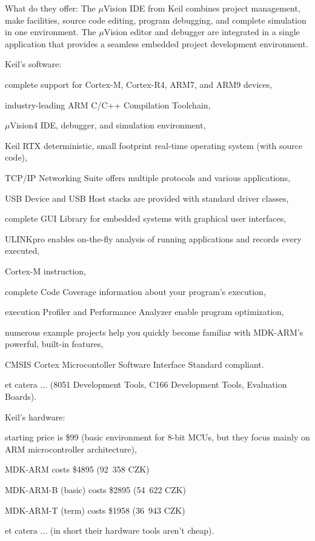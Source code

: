 \documentclass[a4paper,twoside,15pt]{book}
\begin{document}
			What do they offer:
			The $\mu$Vision IDE from Keil combines project management, make facilities, source code editing, program debugging, and complete simulation in one environment. The $\mu$Vision editor and debugger are integrated in a single application that provides a seamless embedded project development environment.
			\begin{dinglist}{73}
				\item Keil's software:
					\begin{dinglist}{75}
						\item complete support for Cortex-M, Cortex-R4, ARM7, and ARM9 devices,
						\item industry-leading ARM C/C++ Compilation Toolchain,
						\item $\mu$Vision4 IDE, debugger, and simulation environment,
						\item Keil RTX deterministic, small footprint real-time operating system (with source code),
						\item TCP/IP Networking Suite offers multiple protocols and various applications,
						\item USB Device and USB Host stacks are provided with standard driver classes,
						\item complete GUI Library for embedded systems with graphical user interfaces,
						\item ULINKpro enables on-the-fly analysis of running applications and records every executed,
						\item Cortex-M instruction,
						\item complete Code Coverage information about your program's execution,
						\item execution Profiler and Performance Analyzer enable program optimization,
						\item numerous example projects help you quickly become familiar with MDK-ARM's powerful, built-in features,
						\item CMSIS Cortex Microcontoller Software Interface Standard compliant.
						\item et catera ... (8051 Development Tools, C166 Development Tools, Evaluation Boards).
					\end{dinglist}
				\item Keil's hardware:
					\begin{dinglist}{75}
						\item starting price is \$99 (basic environment for 8-bit MCUs, but they focus mainly on ARM microcontroller architecture),
						\item MDK-ARM costs \$4895 (92~358 CZK)
						\item MDK-ARM-B (basic) costs \$2895 (54~622 CZK)
						\item MDK-ARM-T (term) costs \$1958 (36~943 CZK)
						\item et catera ... (in short their hardware tools aren't cheap).
					\end{dinglist}
			\end{dinglist}
\end{document}
